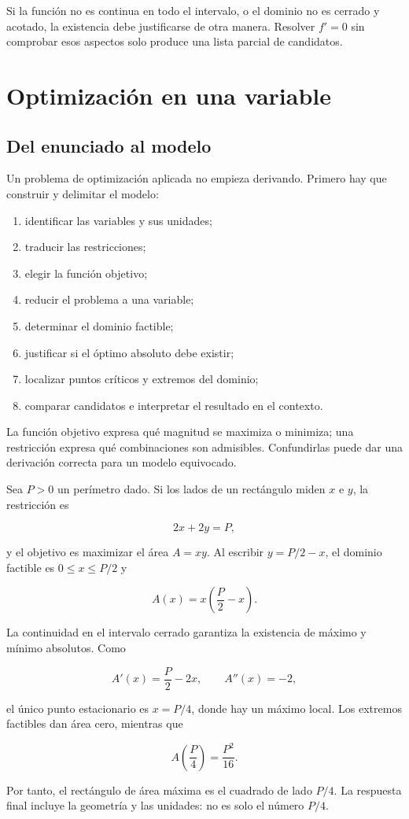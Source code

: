 Si la función no es continua en todo el intervalo, o el dominio no es cerrado
y acotado, la existencia debe justificarse de otra manera. Resolver \(f'=0\)
sin comprobar esos aspectos solo produce una lista parcial de candidatos.

\section{Optimización en una variable}
\label{sec:optimizacion-variable}

\subsection{Del enunciado al modelo}

Un problema de optimización aplicada no empieza derivando. Primero hay que
construir y delimitar el modelo:

\begin{enumerate}
  \item identificar las variables y sus unidades;
  \item traducir las restricciones;
  \item elegir la función objetivo;
  \item reducir el problema a una variable;
  \item determinar el dominio factible;
  \item justificar si el óptimo absoluto debe existir;
  \item localizar puntos críticos y extremos del dominio;
  \item comparar candidatos e interpretar el resultado en el contexto.
\end{enumerate}

La función objetivo expresa qué magnitud se maximiza o minimiza; una
restricción expresa qué combinaciones son admisibles. Confundirlas puede dar
una derivación correcta para un modelo equivocado.

\begin{ejemplo}
Sea \(P>0\) un perímetro dado. Si los lados de un rectángulo miden \(x\) e
\(y\), la restricción es

\[
  2x+2y=P,
\]

y el objetivo es maximizar el área \(A=xy\). Al escribir
\(y=P/2-x\), el dominio factible es \(0\le x\le P/2\) y

\[
  A(x)=x\left(\frac P2-x\right).
\]

La continuidad en el intervalo cerrado garantiza la existencia de máximo y
mínimo absolutos. Como

\[
  A'(x)=\frac P2-2x,
  \qquad
  A''(x)=-2,
\]

el único punto estacionario es \(x=P/4\), donde hay un máximo local. Los
extremos factibles dan área cero, mientras que

\[
  A\left(\frac P4\right)=\frac{P^2}{16}.
\]

Por tanto, el rectángulo de área máxima es el cuadrado de lado \(P/4\). La
respuesta final incluye la geometría y las unidades: no es solo el número
\(P/4\).
\end{ejemplo}

